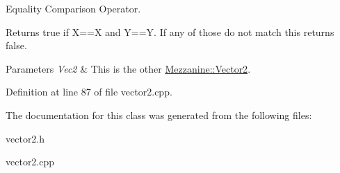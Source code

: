 Equality Comparison Operator. 

Returns true if X==X and Y==Y. If any of those do not match this returns false. 
\begin{DoxyParams}{Parameters}
{\em Vec2} & This is the other \hyperlink{classMezzanine_1_1Vector2}{Mezzanine::Vector2}. \\
\hline
\end{DoxyParams}


Definition at line 87 of file vector2.cpp.



The documentation for this class was generated from the following files:\begin{DoxyCompactItemize}
\item 
vector2.h\item 
vector2.cpp\end{DoxyCompactItemize}

